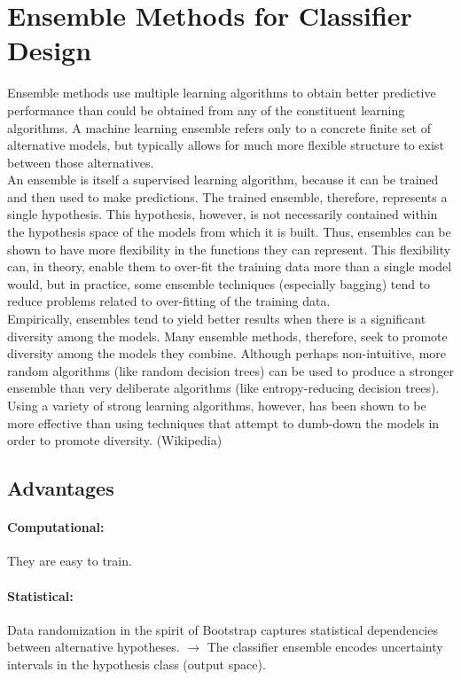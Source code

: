\documentclass[main]{subfiles}
\begin{document}

\section{Ensemble Methods for Classifier Design}
Ensemble methods use multiple learning algorithms to obtain better predictive performance than could be obtained from any of the constituent learning algorithms. A machine learning ensemble refers only to a concrete finite set of alternative models, but typically allows for much more flexible structure to exist between those alternatives.\\
An ensemble is itself a supervised learning algorithm, because it can be trained and then used to make predictions. The trained ensemble, therefore, represents a single hypothesis. This hypothesis, however, is not necessarily contained within the hypothesis space of the models from which it is built. Thus, ensembles can be shown to have more flexibility in the functions they can represent. This flexibility can, in theory, enable them to over-fit the training data more than a single model would, but in practice, some ensemble techniques (especially bagging) tend to reduce problems related to over-fitting of the training data.\\

Empirically, ensembles tend to yield better results when there is a significant diversity among the models. Many ensemble methods, therefore, seek to promote diversity among the models they combine. Although perhaps non-intuitive, more random algorithms (like random decision trees) can be used to produce a stronger ensemble than very deliberate algorithms (like entropy-reducing decision trees). Using a variety of strong learning algorithms, however, has been shown to be more effective than using techniques that attempt to dumb-down the models in order to promote diversity. (Wikipedia)
\subsection{Advantages}
\paragraph{Computational:} They are easy to train.
\paragraph{Statistical:} Data randomization in the spirit of Bootstrap captures statistical dependencies between alternative hypotheses.
\(\rightarrow\) The classifier ensemble encodes uncertainty intervals in the hypothesis class (output space).
\end{document}
